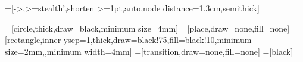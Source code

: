 

\usetikzlibrary{petri,arrows,snakes,backgrounds,matrix,automata,shapes,shadows,patterns,fit,calc}

=[->,>=stealth',shorten >=1pt,auto,node distance=1.3cm,semithick]

=[circle,thick,draw=black,minimum size=4mm]
=[place,draw=none,fill=none]
=[rectangle,inner ysep=1,thick,draw=black!75,fill=black!10,minimum size=2mm,,minimum width=4mm]
=[transition,draw=none,fill=none]
  =[black]


\usetikzlibrary{external}

\newcommand{\tikzsetforce}{\tikzset{external/force remake}}
\newcommand{\tikzsetforcenext}{\tikzset{external/remake next}}


\makeatletter
{}
\makeatother
%
%
